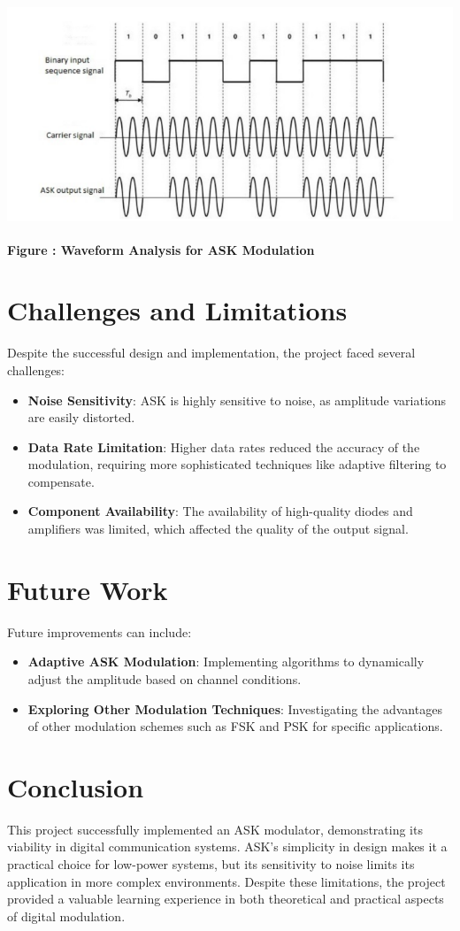 \documentclass[12pt,a4paper]{article}
\begin{document}
\begin{center}
    {\includegraphics[width=550px, height=250px]{waveform.png}}
    \parbox{0.8\textwidth}{ 
        \centering
        \textbf{Figure : Waveform Analysis for ASK Modulation}
    }
\end{center}

\section*{Challenges and Limitations}
Despite the successful design and implementation, the project faced several challenges:
\begin{itemize}
    \item \textbf{Noise Sensitivity}: ASK is highly sensitive to noise, as amplitude variations are easily distorted.
    \item \textbf{Data Rate Limitation}: Higher data rates reduced the accuracy of the modulation, requiring more sophisticated techniques like adaptive filtering to compensate.
    \item \textbf{Component Availability}: The availability of high-quality diodes and amplifiers was limited, which affected the quality of the output signal.
\end{itemize}


\section*{Future Work}
Future improvements can include:
\begin{itemize}
    \item \textbf{Adaptive ASK Modulation}: Implementing algorithms to dynamically adjust the amplitude based on channel conditions.
    \item \textbf{Exploring Other Modulation Techniques}: Investigating the advantages of other modulation schemes such as FSK and PSK for specific applications.
\end{itemize}


\section*{Conclusion}
This project successfully implemented an ASK modulator, demonstrating its viability in digital communication systems. ASK’s simplicity in design makes it a practical choice for low-power systems, but its sensitivity to noise limits its application in more complex environments. Despite these limitations, the project provided a valuable learning experience in both theoretical and practical aspects of digital modulation.
\end{document}
